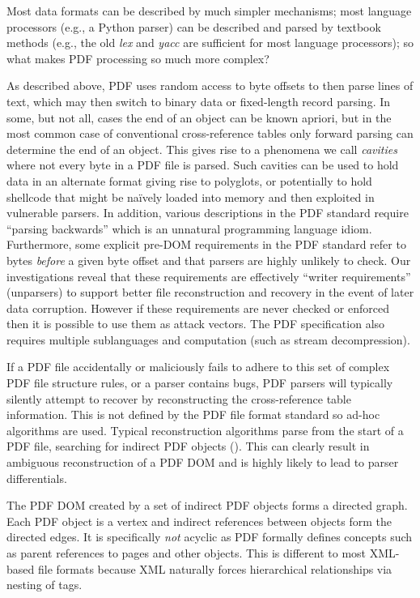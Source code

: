Most data formats can be described by much simpler mechanisms;
most language processors (e.g., a Python parser) can be described and parsed by
textbook methods (e.g., the old \emph{lex} and \emph{yacc} are sufficient for
most language processors);
so what makes PDF processing so much more complex?

As described above, PDF uses random access to byte offsets to then parse lines of text,
which may then switch to binary data or fixed-length record parsing. 
In some, but not all, cases the end of an object can be known apriori, but in the most common case 
of conventional cross-reference tables only forward parsing can determine the end of an object. 
This gives rise to a phenomena we call \emph{cavities} where not every byte in a PDF file is parsed.
Such cavities can be used to hold data in an alternate format giving rise to polyglots, or potentially
to hold shellcode that might be na\"ively loaded into memory and then exploited 
in vulnerable parsers.
In addition, various descriptions in the PDF standard require ``parsing backwards'' which is 
an unnatural programming language idiom. Furthermore, some explicit pre-DOM requirements
in the PDF standard
refer to bytes \emph{before} a given byte offset and that parsers are highly unlikely to check. 
Our investigations reveal that these requirements are effectively ``writer requirements'' (unparsers) to
support better file reconstruction and recovery in the event of later data corruption. 
However if these requirements are never checked or enforced then it is possible to use them as attack
vectors.  
The PDF specification also requires multiple
sublanguages and computation (such as stream decompression).

If a PDF file accidentally or maliciously fails to adhere to this set of complex PDF file structure
rules, or a parser contains bugs, PDF parsers will typically silently attempt to recover
by reconstructing the cross-reference table information. 
This is not defined by the PDF file format standard so 
ad-hoc algorithms are used. Typical reconstruction algorithms parse from the start of a PDF 
file, searching for indirect PDF objects (). This can clearly result
in ambiguous reconstruction of a PDF DOM and is highly likely to lead to parser differentials.

The PDF DOM created by a set of indirect PDF objects forms a directed graph. 
Each PDF object is a vertex and indirect references between objects form the directed edges. It is 
specifically \emph{not} acyclic as PDF formally defines concepts such as parent references to 
pages and other objects. This is different to most XML-based file formats because XML naturally 
forces hierarchical relationships via nesting of tags.

